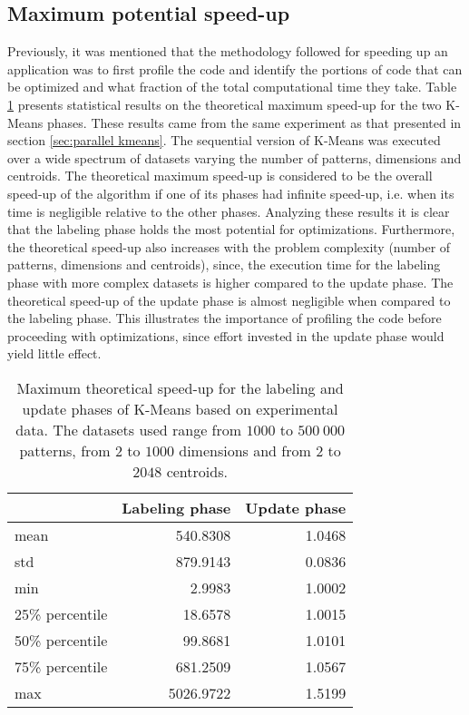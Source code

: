 \subsection{Maximum potential speed-up}

Previously, it was mentioned that the methodology followed for speeding up an application was to first profile the code and identify the portions of code that can be optimized and what fraction of the total computational time they take.
Table \ref{tab:kmeans max speedup} presents statistical results on the theoretical maximum speed-up for the two K-Means phases.
These results came from the same experiment as that presented in section \ref{sec:parallel kmeans}.
The sequential version of K-Means was executed over a wide spectrum of datasets varying the number of patterns, dimensions and centroids.
The theoretical maximum speed-up is considered to be the overall speed-up of the algorithm if one of its phases had infinite speed-up, i.e. when its time is negligible relative to the other phases.
Analyzing these results it is clear that the labeling phase holds the most potential for optimizations.
Furthermore, the theoretical speed-up also increases with the problem complexity (number of patterns, dimensions and centroids), since, the execution time for the labeling phase with more complex datasets is higher compared to the update phase.
The theoretical speed-up of the update phase is almost negligible when compared to the labeling phase.
This illustrates the importance of profiling the code before proceeding with optimizations, since effort invested in the update phase would yield little effect.

\begin{table}[h]
\centering
\caption{Maximum theoretical speed-up for the labeling and update phases of K-Means based on experimental data. The datasets used range from $1000$ to $500 \: 000$ patterns, from $2$ to $1000$ dimensions and from $2$ to $2048$ centroids.}

\begin{tabular}{lrr}
\toprule
{} &  Labeling phase &  Update phase \\
\midrule
mean  &               540.8308 &                    1.0468 \\
std   &               879.9143 &                    0.0836 \\
min   &                 2.9983 &                    1.0002 \\
25\% percentile &      18.6578 &                    1.0015 \\
50\% percentile &      99.8681 &                    1.0101 \\
75\% percentile &     681.2509 &                    1.0567 \\
max   &              5026.9722 &                    1.5199 \\
\bottomrule
\end{tabular}

\label{tab:kmeans max speedup}
\end{table}

